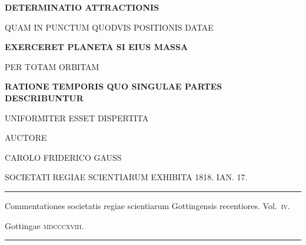 \clearpage{}\thispagestyle{empty}
\vspace*{1.5em}
\begin{center}
\textbf{DETERMINATIO ATTRACTIONIS}

QUAM IN PUNCTUM QUODVIS POSITIONIS DATAE

\textbf{EXERCERET PLANETA SI EIUS MASSA}

PER TOTAM ORBITAM

\textbf{RATIONE TEMPORIS QUO SINGULAE PARTES DESCRIBUNTUR}

UNIFORMITER ESSET DISPERTITA

\bigskip
AUCTORE

\bigskip
CAROLO FRIDERICO GAUSS

\bigskip
SOCIETATI REGIAE SCIENTIARUM EXHIBITA 1818. IAN. 17.

\bigskip
\rule{0.7\linewidth}{0.4pt}

Commentationes societatis regiae scientiarum Gottingensis recentiores. Vol.~\textsc{iv}.

Gottingae \textsc{mdcccxviii}.

\rule{0.7\linewidth}{0.4pt}
\end{center}
